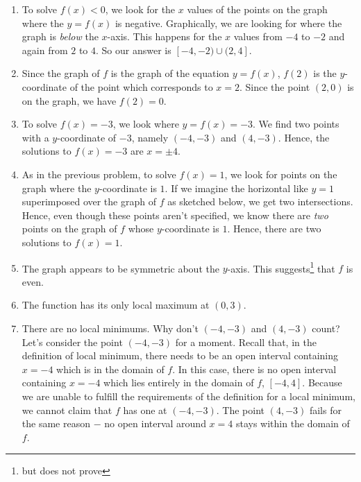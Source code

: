 \documentclass{ximera}
\begin{document}
\begin{example}
\begin{enumerate}
\item  To solve $f(x) < 0$, we look for the $x$ values of the points on the graph where the $y = f(x)$ is negative.   Graphically, we are looking for where the graph is \textit{below}  the $x$-axis.  This happens for the $x$ values from $-4$ to $-2$ and again from $2$ to $4$.  So our answer is $[-4,-2) \cup (2,4]$.

\item  Since the graph of $f$ is the graph of the equation $y=f(x)$, $f(2)$ is the $y$-coordinate of the point which corresponds to $x = 2$.  Since the point $(2,0)$ is on the graph, we have $f(2) = 0$.

\item  To solve $f(x) = -3$, we look where $y = f(x) = -3$.  We find two points with a $y$-coordinate of $-3$, namely $(-4,-3)$ and $(4,-3)$.  Hence, the solutions to $f(x) = -3$ are $x = \pm 4$.

\item As in the previous problem, to solve $f(x)=1$, we look for points on the graph where the $y$-coordinate is $1$.  If we imagine the horizontal like $y=1$ superimposed over the graph of $f$ as sketched below, we get two intersections.  Hence, even though these points aren't specified, we know there are \textit{two} points on the graph of $f$ whose $y$-coordinate is $1$.  Hence, there are two solutions to $f(x) = 1$.

\begin{center}
% 


\end{center}


\item  The graph appears to be symmetric about the $y$-axis.  This suggests\footnote{but does not prove} that $f$ is even.

\item  The function has its only local maximum at $(0,3)$.

\item  There are no local minimums.  Why don't $(-4, -3)$ and $(4, -3)$ count?  Let's consider the point $(-4, -3)$ for a moment.  Recall that, in the definition of local minimum, there needs to be an open interval containing  $x = -4$ which is in the domain of $f$.  In this case, there is no open interval containing $x=-4$ which lies entirely in the domain of $f$, $[-4,4]$.  Because we are unable to fulfill the requirements of the definition for a local minimum, we cannot claim that $f$ has one at $(-4, -3)$.  The point $(4, -3)$ fails for the same reason $-$ no open interval around $x = 4$ stays within the domain of $f$.


\end{enumerate}
\end{example}
\end{document}
